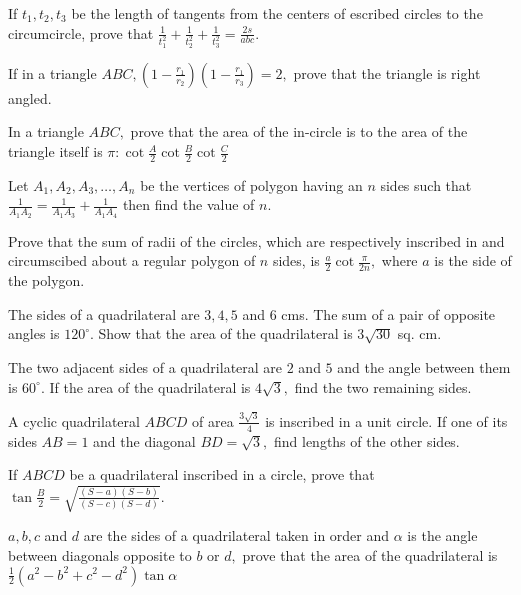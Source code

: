 \item If $t_1, t_2, t_3$ be the length of tangents from the centers of escribed circles to the circumcircle, prove that
   $\frac{1}{t_1^2} + \frac{1}{t_2^2} + \frac{1}{t_3^2} = \frac{2s}{abc}.$

\item If in a triangle $ABC, \left(1 - \frac{r_1}{r_2}\right)\left(1 - \frac{r_1}{r_3}\right) = 2,$ prove that the
   triangle is right angled.

\item In a triangle $ABC,$ prove that the area of the in-circle is to the area of the triangle itself is $\pi:
   \cot\frac{A}{2}\cot\frac{B}{2}\cot\frac{C}{2}$

\item Let $A_1, A_2, A_3, \ldots, A_n$ be the vertices of polygon having an $n$ sides such that $\frac{1}{A_1A_2} =
   \frac{1}{A_1A_3} + \frac{1}{A_1A_4}$ then find the value of $n.$

\item Prove that the sum of radii of the circles, which are respectively inscribed in and circumscibed about a regular polygon of
   $n$ sides, is $\frac{a}{2}\cot\frac{\pi}{2n},$ where $a$ is the side of the polygon.

\item The sides of a quadrilateral are $3, 4, 5$ and $6$ cms. The sum of a pair of opposite angles is $120^\circ.$
   Show that the area of the quadrilateral is $3\sqrt{30}$ sq. cm.

\item The two adjacent sides of a quadrilateral are $2$ and $5$ and the angle between them is $60^\circ.$ If the
   area of the quadrilateral is $4\sqrt{3},$ find the two remaining sides.

\item A cyclic quadrilateral $ABCD$ of area $\frac{3\sqrt{3}}{4}$ is inscribed in a unit circle. If one of its sides
   $AB = 1$ and the diagonal $BD = \sqrt{3},$ find lengths of the other sides.

\item If $ABCD$ be a quadrilateral inscribed in a circle, prove that $\tan\frac{B}{2} = \sqrt{\frac{(S - a)(S - b)}{(S -
   c)(S - d)}}.$

\item $a, b, c$ and $d$ are the sides of a quadrilateral taken in order and $\alpha$ is the angle between diagonals
   opposite to $b$ or $d,$ prove that the area of the quadrilateral is $\frac{1}{2}(a^2 - b^2 + c^2 -
   d^2)\tan\alpha$

